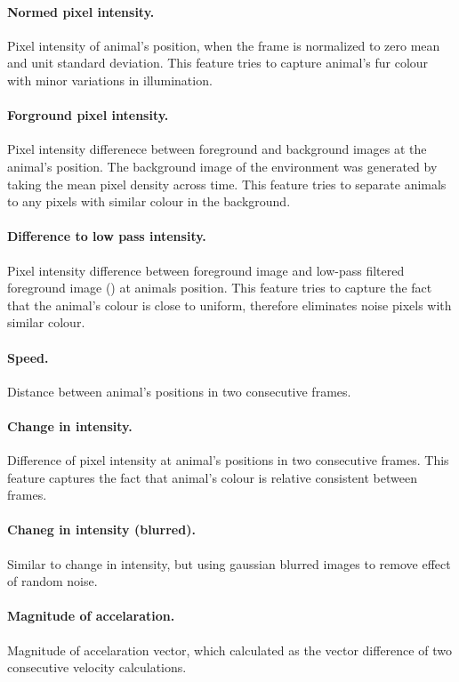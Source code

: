 \paragraph{Normed pixel intensity.} Pixel intensity of animal's position, when the frame is normalized to zero mean and unit standard deviation. This feature tries to capture animal's fur colour with minor variations in illumination.

\paragraph{Forground pixel intensity.} Pixel intensity differenece between foreground and background images at the animal's position. The background image of the environment was generated by taking the mean pixel density across time. This feature tries to separate animals to any pixels with similar colour in the background.

\paragraph{Difference to low pass intensity.} Pixel intensity difference between foreground image and low-pass filtered foreground image () at animals position. This feature tries to capture the fact that the animal's colour is close to uniform, therefore eliminates noise pixels with similar colour.

\paragraph{Speed.} Distance between animal's positions in two consecutive frames. 

\paragraph{Change in intensity.} Difference of pixel intensity at animal's positions in two consecutive frames. This feature captures the fact that animal's colour is relative consistent between frames.

\paragraph{Chaneg in intensity (blurred).} Similar to change in intensity, but using gaussian blurred images to remove effect of random noise.

\paragraph{Magnitude of accelaration.} Magnitude of accelaration vector, which calculated as the vector difference of two consecutive velocity calculations. 

